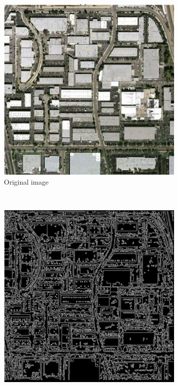 \documentclass[conference]{IEEEtran}
\begin{document}
\begin{figure}
  \begin{center}
    \begin{subfigure}[b]{0.48\linewidth}
        \centerline{\includegraphics[width=\linewidth]{anisotropic_a.JPG}}
        \caption{Original image \label{subfig:anisotropic_a}}
    \end{subfigure}
    \\
     \begin{subfigure}[b]{0.48\linewidth}
        \centerline{\includegraphics[width=\linewidth]{anisotropic_b.JPG}}

\end{subfigure}
\end{center}
\end{figure}
\end{document}
